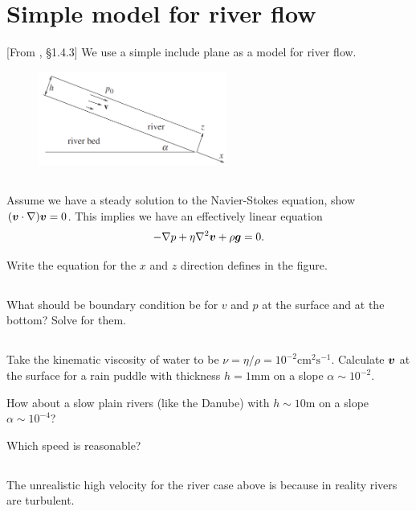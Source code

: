 \documentclass[11pt,letterpaper]{article}
\begin{document}
\section{Simple model for river flow}
[From \cite{Falkovich_18}, \S 1.4.3] 
We use a simple include plane as a model for river flow.
\begin{figure}[H]
    \centering
    \includegraphics[width=0.55\textwidth]{figs/incline_river}
\end{figure}

\subsection{}
Assume we have a steady solution to the Navier-Stokes equation, show $(\boldsymbol{v}\cdot\nabla)\boldsymbol{v} = 0$. This implies we have an effectively linear equation
\begin{align}
    -\nabla p+\eta\nabla^2\boldsymbol{v}+\rho\boldsymbol{g} = 0.
\end{align}

Write the equation for the $x$ and $z$ direction defines in the figure.

\subsection{}
What should be boundary condition be for $v$ and $p$ at the surface and at the bottom? Solve for them.

\subsection{}
Take the kinematic viscosity of water to be $\nu = \eta/\rho = 10^{-2}\text{cm}^2\text{s}^{-1}$. Calculate $\boldsymbol{v}$ at the surface for a rain puddle with thickness $h = 1\text{mm}$ on a slope $\alpha\sim 10^{-2}$.

How about a slow plain rivers (like the Danube) with $h \sim 10\text{m}$ on a slope $\alpha\sim 10^{-4}$?

Which speed is reasonable?

\subsection{}
The unrealistic high velocity for the river case above is because in reality rivers are turbulent. 











    
\vfill
\printbibliography
\end{document}
